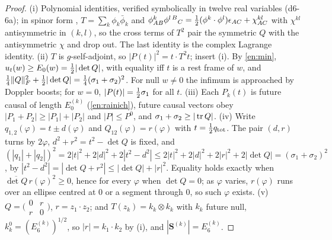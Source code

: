 \begin{proof}
(i) Polynomial identities, verified symbolically in twelve real variables (d6-6a); in spinor form \cite{PenroseRindler84}, $T=\sum_k\phi_k\bar\phi_k$ and
$\phi^k_{AB}\phi^{l\,B}{}_C=\tfrac12(\phi^k\cdot\phi^l)\epsilon_{AC}+\chi^{kl}_{AC}$ with $\chi^{kl}$ antisymmetric in $(k,l)$, so the cross terms of $T^2$
pair the symmetric $Q$ with the antisymmetric $\chi$ and drop out. The last identity is the complex Lagrange identity. (ii) $T$ is
$g$-self-adjoint, so $|P(t)|^2=t\cdot T^2t$; insert (i). By \cref{en:min}, $u_t(w)\ge E_0(w)=\tfrac12|\det Q|$, with equality iff $t$ is a
rest frame of $w$, and $\tfrac14\|Q\|_F^2+\tfrac12|\det Q|=\tfrac14(\sigma_1+\sigma_2)^2$. For null $w\neq0$ the infimum is approached by Doppler boosts;
for $w=0$, $|P(t)|=\tfrac12\sigma_1$ for all $t$. (iii) Each $P_k(t)$ is future causal of length $E_0^{(k)}$ (\cref{en:rainich}), future causal
vectors obey $|P_1+P_2|\ge|P_1|+|P_2|$ and $|P|\le P^0$, and $\sigma_1+\sigma_2\ge|\operatorname{tr} Q|$. (iv) Write $q_{1,2}(\varphi)=t\pm d(\varphi)$ and
$Q_{12}(\varphi)=r(\varphi)$ with $t=\tfrac12 q_{\rm tot}$. The pair $(d,r)$ turns by $2\varphi$, $d^2+r^2=t^2-\det Q$ is fixed, and
$(|q_1|+|q_2|)^2=2|t|^2+2|d|^2+2|t^2-d^2|\le2|t|^2+2|d|^2+2|r|^2+2|\det Q|=(\sigma_1+\sigma_2)^2$, by $|t^2-d^2|=|\det Q+r^2|\le|\det Q|+|r|^2$.
Equality holds exactly when $\overline{\det Q}\,r(\varphi)^2\ge0$, hence for every $\varphi$ when $\det Q=0$; as $\varphi$ varies, $r(\varphi)$ runs over an ellipse centred at $0$ or a
segment through $0$, so such $\varphi$ exists. (v) $Q=\bigl(\begin{smallmatrix}0&r\\r&0\end{smallmatrix}\bigr)$, $r=z_1\cdot z_2$; and
$T(z_k)=k_k\otimes k_k$ with $k_k$ future null, $k_k^0=(E_6^{(k)})^{1/2}$, so $|r|=k_1\cdot k_2$ by (i), and $|\mathbf S^{(k)}|=E_6^{(k)}$.
\end{proof}

